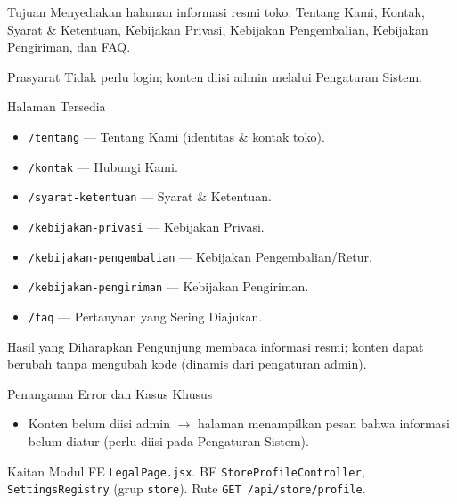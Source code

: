 
\begin{flowsection}{Tujuan}
Menyediakan halaman informasi resmi toko: Tentang Kami, Kontak, Syarat \&
Ketentuan, Kebijakan Privasi, Kebijakan Pengembalian, Kebijakan Pengiriman,
dan FAQ.
\end{flowsection}

\begin{flowsection}{Prasyarat}
Tidak perlu login; konten diisi admin melalui Pengaturan Sistem.
\end{flowsection}

\begin{flowsection}{Halaman Tersedia}
\begin{itemize}
  \item \texttt{/tentang} --- Tentang Kami (identitas \& kontak toko).
  \item \texttt{/kontak} --- Hubungi Kami.
  \item \texttt{/syarat-ketentuan} --- Syarat \& Ketentuan.
  \item \texttt{/kebijakan-privasi} --- Kebijakan Privasi.
  \item \texttt{/kebijakan-pengembalian} --- Kebijakan Pengembalian/Retur.
  \item \texttt{/kebijakan-pengiriman} --- Kebijakan Pengiriman.
  \item \texttt{/faq} --- Pertanyaan yang Sering Diajukan.
\end{itemize}
\end{flowsection}



\begin{flowsection}{Hasil yang Diharapkan}
Pengunjung membaca informasi resmi; konten dapat berubah tanpa mengubah kode
(dinamis dari pengaturan admin).
\end{flowsection}

\begin{flowsection}{Penanganan Error dan Kasus Khusus}
\begin{itemize}
  \item Konten belum diisi admin $\rightarrow$ halaman menampilkan pesan bahwa
        informasi belum diatur (perlu diisi pada Pengaturan Sistem).
\end{itemize}
\end{flowsection}

\begin{flowsection}{Kaitan Modul}
FE \texttt{LegalPage.jsx}. BE \texttt{StoreProfileController},
\texttt{SettingsRegistry} (grup \texttt{store}). Rute \texttt{GET /api/store/profile}.
\end{flowsection}

